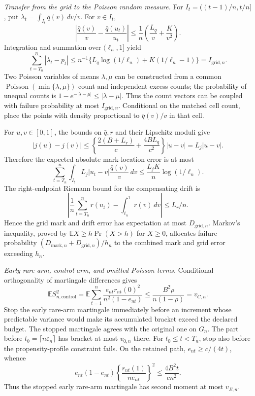 \emph{Transfer from the grid to the Poisson random measure.}
For \(I_t=((t-1)/n,t/n]\), put
\(\lambda_t=\int_{I_t}\bar q(v)\,dv/v\).  For \(v\in I_t\),
\[
 \left|\frac{\bar q(v)}v-\frac{\bar q(u_t)}{u_t}\right|
 \leq \frac1n\left(\frac{L_q}{v}+\frac K{v^2}\right).
\]
Integration and summation over \((\ell_n,1]\) yield
\[
 \sum_{t=T_n}^n|\lambda_t-p_t|
 \leq n^{-1}\{L_q\log(1/\ell_n)+K(1/\ell_n-1)\}
 =I_{\mathrm{grid},n}.
\]
Two Poisson variables of means \(\lambda,\mu\) can be constructed from a common
\(\operatorname{Poisson}(\min\{\lambda,\mu\})\) count and independent excess counts; the probability of unequal counts is
\(1-e^{-|\lambda-\mu|}\leq|\lambda-\mu|\).
Thus the count vectors can be coupled with failure probability at most
\(I_{\mathrm{grid},n}\).  Conditional on the matched cell count, place the points with density proportional to \(\bar q(v)/v\) in that cell.

For \(u,v\in[0,1]\), the bounds on \(\bar q,r\) and their Lipschitz moduli give
\[
 |j(u)-j(v)|
 \leq\left\{\frac{2(B+L_r)}c+\frac{4BL_q}{c^2}\right\}|u-v|
 =L_j|u-v|.
\]
Therefore the expected absolute mark-location error is at most
\[
 \sum_{t=T_n}^n\int_{I_t}L_j|u_t-v|\frac{\bar q(v)}v\,dv
 \leq \frac{L_jK}{n}\log(1/\ell_n).
\]
The right-endpoint Riemann bound for the compensating drift is
\[
 \left|\frac1n\sum_{t=T_n}^nr(u_t)-\int_{\ell_n}^1r(v)\,dv\right|
 \leq L_r/n.
\]
Hence the grid mark and drift error has expectation at most
\(D_{\mathrm{grid},n}\).  Markov's inequality, proved by
\(\mathbb E X\geq h\Pr(X>h)\) for \(X\geq0\), allocates failure probability
\((D_{\mathrm{mark},n}+D_{\mathrm{grid},n})/h_n\) to the combined mark and grid error exceeding \(h_n\).

\emph{Early rare-arm, control-arm, and omitted Poisson terms.}
Conditional orthogonality of martingale differences gives
\[
 \mathbb E S_{n,\mathrm{control}}^2
 =\mathbb E\sum_{t=1}^n
 \frac{e_{nt}r_{nt}(0)^2}{n^2(1-e_{nt})}
 \leq\frac{B^2\rho}{n(1-\rho)}
 =v_{C,n}.
\]
Stop the early rare-arm martingale immediately before an increment whose predictable variance would make its accumulated bracket exceed the declared budget.  The stopped martingale agrees with the original one on \(G_n\).  The part before
\(t_0=\lceil n\varepsilon_n\rceil\) has bracket at most \(v_{0,n}\) there.  For \(t_0\leq t<T_n\), stop also before the propensity-profile constraint fails.  On the retained path, \(e_{nt}\geq c/(4t)\), whence
\[
 e_{nt}(1-e_{nt})
 \left\{\frac{r_{nt}(1)}{n e_{nt}}\right\}^2
 \leq\frac{4B^2t}{cn^2}.
\]
Thus the stopped early rare-arm martingale has second moment at most \(v_{E,n}\).

